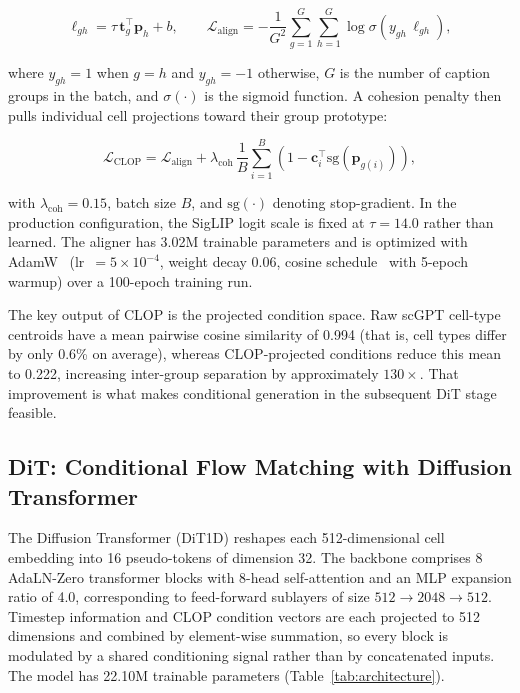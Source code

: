 \documentclass[11pt,a4paper]{article}
\begin{document}
\begin{linenomath}
\begin{equation}
\ell_{gh} = \tau\,\mathbf{t}_g^\top \mathbf{p}_h + b, \qquad
\mathcal{L}_\text{align} = -\frac{1}{G^2}\sum_{g=1}^{G}\sum_{h=1}^{G}\log\sigma\!\left(y_{gh}\,\ell_{gh}\right),
\label{eq:clop}
\end{equation}
\end{linenomath}

where $y_{gh}=1$ when $g=h$ and $y_{gh}=-1$ otherwise, $G$ is the number of caption groups in the batch, and $\sigma(\cdot)$ is the sigmoid function. A cohesion penalty then pulls individual cell projections toward their group prototype:

\begin{linenomath}
\begin{equation}
\mathcal{L}_\text{CLOP} = \mathcal{L}_\text{align} + \lambda_\text{coh}\,\frac{1}{B}\sum_{i=1}^{B}\left(1 - \mathbf{c}_i^\top \mathrm{sg}(\mathbf{p}_{g(i)})\right),
\end{equation}
\end{linenomath}

with $\lambda_\text{coh}=0.15$, batch size $B$, and $\mathrm{sg}(\cdot)$ denoting stop-gradient. In the production configuration, the SigLIP logit scale is fixed at $\tau = 14.0$ rather than learned. The aligner has 3.02M trainable parameters and is optimized with AdamW~\cite{ref-adamw} (lr~$= 5 \times 10^{-4}$, weight decay 0.06, cosine schedule~\cite{ref-cosine-schedule} with 5-epoch warmup) over a 100-epoch training run.

The key output of CLOP is the projected condition space. Raw scGPT cell-type centroids have a mean pairwise cosine similarity of 0.994 (that is, cell types differ by only 0.6\% on average), whereas CLOP-projected conditions reduce this mean to 0.222, increasing inter-group separation by approximately $130\times$. That improvement is what makes conditional generation in the subsequent DiT stage feasible.

\subsection{DiT: Conditional Flow Matching with Diffusion Transformer}\label{sec:dit}

The Diffusion Transformer (DiT1D) reshapes each 512-dimensional cell embedding into 16 pseudo-tokens of dimension 32. The backbone comprises 8 AdaLN-Zero transformer blocks with 8-head self-attention and an MLP expansion ratio of 4.0, corresponding to feed-forward sublayers of size $512 \to 2048 \to 512$. Timestep information and CLOP condition vectors are each projected to 512 dimensions and combined by element-wise summation, so every block is modulated by a shared conditioning signal rather than by concatenated inputs. The model has 22.10M trainable parameters (Table~\ref{tab:architecture}).
\end{document}
